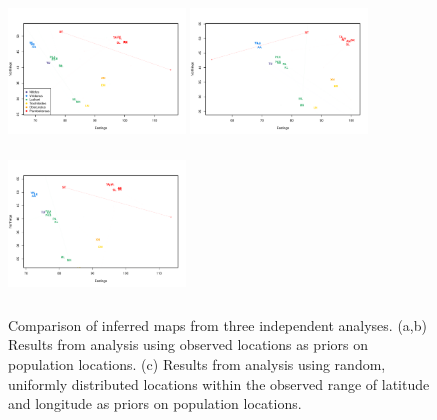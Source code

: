 \documentclass[10pt,letterpaper]{article}
\begin{document}
\begin{figure}
	\centering
		\subcaptionbox{\label{warb_pop_realpr1}}
			{\includegraphics[width=1.85in,height=1.54in]{../figs/warblers/population_warbler_map_realpr1.pdf}}
		\subcaptionbox{\label{warb_pop_realpr2}}			
			{\includegraphics[width=1.85in,height=1.54in]{../figs/warblers/population_warbler_map_realpr2.pdf}}
		\subcaptionbox{\label{warb_pop_randpr1}}
			{\includegraphics[width=1.85in,height=1.54in]{../figs/warblers/population_warbler_map_randpr1.pdf}}
	\caption{Comparison of inferred maps from three independent analyses.  (a,b) Results from analysis using observed locations as priors on population locations.  (c) Results from analysis using random, uniformly distributed locations within the observed range of latitude and longitude as priors on population locations.}\label{sfig:warbler_pop_compare}
\end{figure}
\end{document}
